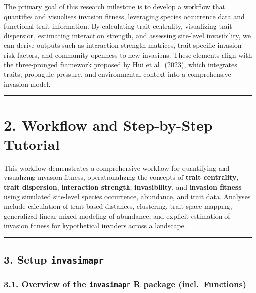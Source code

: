 \documentclass[
]{article}
\begin{document}
The primary goal of this research milestone is to develop a workflow
that quantifies and visualises invasion fitness, leveraging species
occurrence data and functional trait information. By calculating trait
centrality, visualizing trait dispersion, estimating interaction
strength, and assessing site-level invasibility, we can derive outputs
such as interaction strength matrices, trait-specific invasion risk
factors, and community openness to new invasions. These elements align
with the three-pronged framework proposed by Hui et al.~(2023), which
integrates traits, propagule pressure, and environmental context into a
comprehensive invasion model.

\begin{center}\rule{0.5\linewidth}{0.5pt}\end{center}

\hypertarget{workflow-and-step-by-step-tutorial}{%
\section{2. Workflow and Step-by-Step
Tutorial}\label{workflow-and-step-by-step-tutorial}}

This workflow demonstrates a comprehensive workflow for quantifying and
visualizing invasion fitness, operationalizing the concepts of
\textbf{trait centrality}, \textbf{trait dispersion},
\textbf{interaction strength}, \textbf{invasibility}, and
\textbf{invasion fitness} using simulated site-level species occurrence,
abundance, and trait data. Analyses include calculation of trait-based
distances, clustering, trait-space mapping, generalized linear mixed
modeling of abundance, and explicit estimation of invasion fitness for
hypothetical invaders across a landscape.

\begin{center}\rule{0.5\linewidth}{0.5pt}\end{center}

\hypertarget{setup-invasimapr}{%
\subsection{\texorpdfstring{3. Setup
\texttt{invasimapr}}{3. Setup invasimapr}}\label{setup-invasimapr}}

\hypertarget{overview-of-the-invasimapr-r-package-incl.-functions}{%
\subsubsection{\texorpdfstring{3.1. Overview of the \texttt{invasimapr}
R package
(incl.~Functions)}{3.1. Overview of the invasimapr R package (incl.~Functions)}}\label{overview-of-the-invasimapr-r-package-incl.-functions}}
\end{document}
